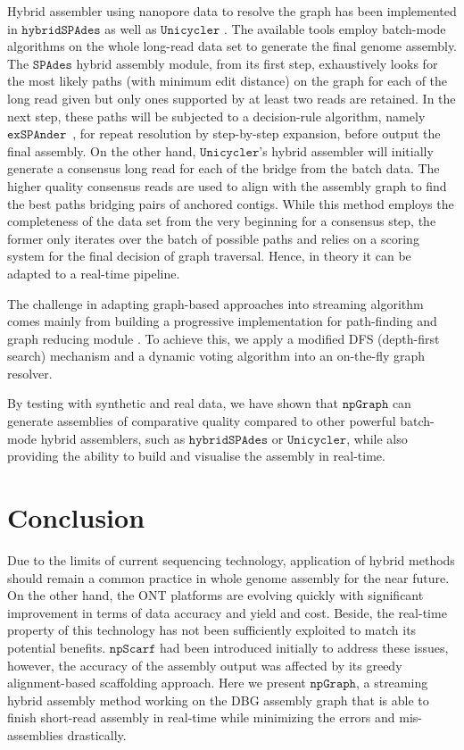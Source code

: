 \documentclass[10pt,letterpaper]{article}
\newcommand{\npscarf}{$\mathtt{npScarf}$}
\newcommand{\npgraph}{$\mathtt{npGraph}$}
\newcommand{\unicycler}{$\mathtt{Unicycler}$}
\newcommand{\spades}{$\mathtt{SPAdes}$}
\begin{document}
Hybrid assembler using nanopore data to resolve the graph has been implemented in $\mathtt{hybridSPAdes}$ \cite{AntipovKM2015} as well as \unicycler{} \cite{Wick2017unicycler}. 
The available tools employ batch-mode algorithms on the whole long-read data set to generate the final genome assembly. 
The \spades{} hybrid assembly module, from its first step, exhaustively looks for the most likely paths (with minimum edit distance) on the graph for each of the long read given but only ones supported by at least two reads are retained. In the next step, these paths will be subjected to a decision-rule algorithm, namely $\mathtt{exSPAnder}$~\cite{Prjibelski2014}, for repeat resolution by step-by-step expansion, before output the final assembly.
On the other hand, \unicycler{}'s hybrid assembler will initially generate a consensus long read for each of the bridge from the batch data. 
The higher quality consensus reads are used to align with the assembly graph to find the best paths bridging pairs of anchored contigs.
While this method employs the completeness of the data  set from the very beginning for a consensus step, the former only iterates over the batch of possible paths and relies on a scoring system for the final decision of graph traversal. Hence, in theory it can be adapted to a real-time pipeline.
    
The challenge in adapting graph-based  approaches into streaming algorithm comes mainly from building a progressive implementation for path-finding and graph reducing module . 
To achieve this, we apply a modified DFS (depth-first search) mechanism and a dynamic voting algorithm into an on-the-fly graph resolver.
 
By testing with synthetic and real data, we have shown that \npgraph{} can generate assemblies of comparative quality compared to other powerful batch-mode hybrid assemblers, such as $\mathtt{hybridSPAdes}$ or \unicycler{}, while also providing the ability to build and visualise the assembly in real-time. 


\section*{Conclusion}
Due to the limits of current sequencing technology, application of hybrid methods should remain a common practice in whole genome assembly for the near future.
On the other hand, the ONT platforms are evolving quickly with significant improvement in terms of data accuracy and yield and cost. Beside, the real-time property of this technology has not been sufficiently exploited to match its potential benefits.
\npscarf{} had been introduced initially to address these issues, however, the accuracy of the assembly output was affected by its greedy alignment-based scaffolding approach.
Here we present \npgraph{}, a streaming hybrid assembly method working on the DBG assembly graph that is able to finish short-read assembly in real-time while minimizing the errors and mis-assemblies drastically.
\end{document}

